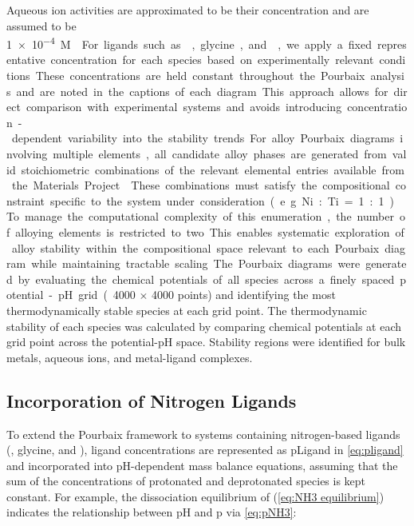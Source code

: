 \documentclass[journal=jacsat,manuscript=article]{achemso}
\begin{document}
Aqueous ion activities are approximated to be their concentration and are assumed to be \SI{1e-4}M \cite{Huang2017ImprovedCompounds, Wang2020PredictingFunctional, Patel2019EfficientCompounds, Thompson2011PourbaixSystems}. For ligands such as , glycine, and , we apply a fixed representative concentration for each species based on experimentally relevant conditions. These concentrations are held constant throughout the Pourbaix analysis and are noted in the captions of each diagram. This approach allows for direct comparison with experimental systems and avoids introducing concentration-dependent variability into the stability trends.

For alloy Pourbaix diagrams involving multiple elements, all candidate alloy phases are generated from valid stoichiometric combinations of the relevant elemental entries available from the Materials Project \cite{Jain2013TheInnovation}. These combinations must satisfy the compositional constraint specific to the system under consideration (e.g. Ni:Ti = 1:1) \cite{Thompson2011PourbaixSystems}. To manage the computational complexity of this enumeration, the number of alloying elements is restricted to two. This enables systematic exploration of alloy stability within the compositional space relevant to each Pourbaix diagram while maintaining tractable scaling. 



The Pourbaix diagrams were generated by evaluating the chemical potentials of all species across a finely spaced potential-pH grid (4000 $\times$ 4000 points) and identifying the most thermodynamically stable species at each grid point. The thermodynamic stability of each species was calculated by comparing chemical potentials at each grid point across the potential-pH space. Stability regions were identified for bulk metals, aqueous ions, and metal-ligand complexes. 


\subsection{Incorporation of Nitrogen Ligands}

To extend the Pourbaix framework to systems containing nitrogen-based ligands (, glycine, and ), ligand concentrations are represented as pLigand in \ref{eq:pligand} and incorporated into pH-dependent mass balance equations, assuming that the sum of the concentrations of protonated and deprotonated species is kept constant. For example, the dissociation equilibrium of  (\ref{eq:NH3 equilibrium}) indicates the relationship between pH and p via \ref{eq:pNH3}:
\end{document}
